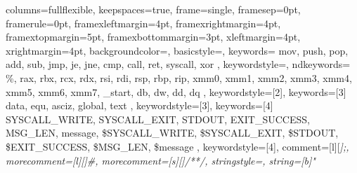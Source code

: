{
    columns=fullflexible,
    keepspaces=true,
    frame=single,
    framesep=0pt,
    framerule=0pt,
    framexleftmargin=4pt,
    framexrightmargin=4pt,
    framextopmargin=5pt,
    framexbottommargin=3pt,
    xleftmargin=4pt,
    xrightmargin=4pt,
    backgroundcolor=\color{GrayCodeBlock},
    basicstyle=\ttfamily\color{BlackText},
    keywords={
        mov, push, pop, add, sub, jmp, je, jne, cmp, call, ret,
        syscall, xor
    },
    keywordstyle=\color{PurpleInstruction},
    ndkeywords={
        \%, rax, rbx, rcx, rdx, rsi, rdi, rsp, rbp, rip,
        xmm0, xmm1, xmm2, xmm3, xmm4, xmm5, xmm6, xmm7,
        \_start, db, dw, dd, dq
    },
    keywordstyle=[2]\color{OrangeRegister},
    keywords=[3]{
        data, equ, asciz, global, text
    },
    keywordstyle=[3]\color{BlueDirective},
    keywords=[4]{
        SYSCALL\_WRITE, SYSCALL\_EXIT, STDOUT, EXIT\_SUCCESS,
        MSG\_LEN, message, \$SYSCALL\_WRITE, \$SYSCALL\_EXIT, 
        \$STDOUT, \$EXIT\_SUCCESS, \$MSG\_LEN, \$message
    },
    keywordstyle=[4]\color{RedUserLabel},
    comment=[l][\color{GrayComment}\slshape]{;},
    morecomment=[l][\color{GrayComment}\slshape]{\#},
    morecomment=[s][\color{GrayComment}\slshape]{/*}{*/},
    stringstyle=\color{GreenString},
    string=[b]"
}
